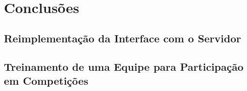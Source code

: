 
\chapter{Conclusões}

\label{CapConclusoes}


\section{Reimplementação da Interface com o Servidor}

\section{Treinamento de uma Equipe para Participação em Competições}

 